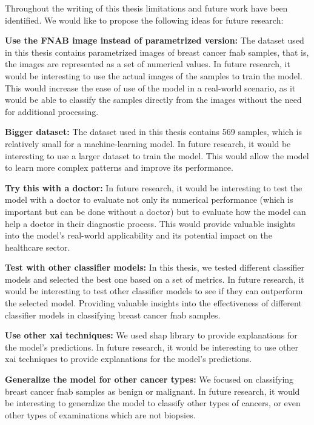 Throughout the writing of this thesis limitations and future work have been identified. We would like to propose the following ideas for future research:

\textbf{Use the FNAB image instead of parametrized version:} The dataset used in this thesis contains parametrized images of breast cancer \ac{fnab} samples, that is, the images are represented as a set of numerical values. In future research, it would be interesting to use the actual images of the samples to train the model. This would increase the ease of use of the model in a real-world scenario, as it would be able to classify the samples directly from the images without the need for additional processing.

\textbf{Bigger dataset:} The dataset used in this thesis contains 569 samples, which is relatively small for a machine-learning model. In future research, it would be interesting to use a larger dataset to train the model. This would allow the model to learn more complex patterns and improve its performance.

\textbf{Try this with a doctor:} In future research, it would be interesting to test the model with a doctor to evaluate not only its numerical performance (which is important but can be done without a doctor) but to evaluate how the model can help a doctor in their diagnostic process. This would provide valuable insights into the model's real-world applicability and its potential impact on the healthcare sector.

\textbf{Test with other classifier models:} In this thesis, we tested different classifier models and selected the best one based on a set of metrics. In future research, it would be interesting to test other classifier models to see if they can outperform the selected model. Providing valuable insights into the effectiveness of different classifier models in classifying breast cancer \ac{fnab} samples.

\textbf{Use other \ac{xai} techniques:} We used \ac{shap} library to provide explanations for the model's predictions. In future research, it would be interesting to use other \ac{xai} techniques to provide explanations for the model's predictions.

\textbf{Generalize the model for other cancer types:} We focused on classifying breast cancer \ac{fnab} samples as benign or malignant. In future research, it would be interesting to generalize the model to classify other types of cancers, or even other types of examinations which are not biopsies.